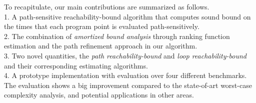 To recapitulate, our main contributions are summarized as follows.
\\
1. A path-sensitive reachability-bound algorithm that computes sound bound on the times that each program point is evaluated path-sensitively.
\\
2. The combination of \emph{amortized bound analysis} through ranking function estimation and the path refinement approach in our algorithm.
\\
3. Two novel quantities, the \emph{path reachability-bound} and \emph{loop reachability-bound} and their corresponding estimating algorithms.
\\
4. A prototype implementation with evaluation over four different benchmarks.
 The evaluation shows a big improvement compared to the state-of-art worst-case complexity analysis, and potential applications in other areas.
